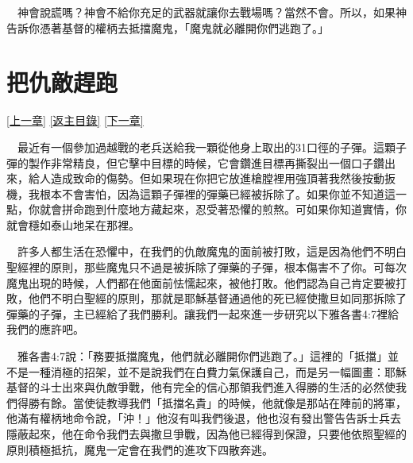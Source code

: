 \documentclass{book}
\begin{document}
　神會說謊嗎？神會不給你充足的武器就讓你去戰場嗎？當然不會。所以，如果神告訴你憑著基督的權柄去抵擋魔鬼，「魔鬼就必離開你們逃跑了。」

\chapter{把仇敵趕跑}
\label{sec:ch18}
\hyperref[sec:ch17]{[上一章]}
\hyperlink{toc}{[返主目錄]}
\hyperref[sec:ch19]{[下一章]}

\begin{center}
\noindent{}
\end{center}

　最近有一個參加過越戰的老兵送給我一顆從他身上取出的31口徑的子彈。這顆子彈的製作非常精良，但它擊中目標的時候，它會鑽進目標再撕裂出一個口子鑽出來，給人造成致命的傷勢。但如果現在你把它放進槍膛裡用強頂著我然後按動扳機，我根本不會害怕，因為這顆子彈裡的彈藥已經被拆除了。如果你並不知道這一點，你就會拼命跑到什麼地方藏起來，忍受著恐懼的煎熬。可如果你知道實情，你就會穩如泰山地呆在那裡。

　許多人都生活在恐懼中，在我們的仇敵魔鬼的面前被打敗，這是因為他們不明白聖經裡的原則，那些魔鬼只不過是被拆除了彈藥的子彈，根本傷害不了你。可每次魔鬼出現的時候，人們都在他面前怯懦起來，被他打敗。他們認為自己肯定要被打敗，他們不明白聖經的原則，那就是耶穌基督通過他的死已經使撒旦如同那拆除了彈藥的子彈，主已經給了我們勝利。讓我們一起來進一步研究以下雅各書4:7裡給我們的應許吧。

　雅各書4:7說：「務要抵擋魔鬼，他們就必離開你們逃跑了。」這裡的「抵擋」並不是一種消極的招架，並不是說我們在白費力氣保護自己，而是另一幅圖畫：耶穌基督的斗士出來與仇敵爭戰，他有完全的信心那領我們進入得勝的生活的必然使我們得勝有餘。當使徒教導我們「抵擋名貴」的時候，他就像是那站在陣前的將軍，他滿有權柄地命令說，「沖！」他沒有叫我們後退，他也沒有發出警告告訴士兵去隱蔽起來，他在命令我們去與撒旦爭戰，因為他已經得到保證，只要他依照聖經的原則積極抵抗，魔鬼一定會在我們的進攻下四散奔逃。
\end{document}
